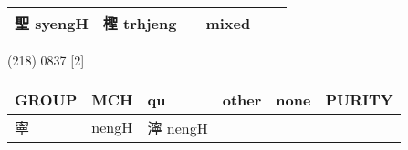 \documentclass[14pt,a4paper]{scrartcl}
\begin{document}
\begin{longtable}[c]{@{}llllll@{}}
\begin{minipage}[t]{0.14\columnwidth}
聖 syengH
\strut\end{minipage} &
\begin{minipage}[t]{0.14\columnwidth}\raggedright\strut
檉 trhjeng
\strut\end{minipage} &
\begin{minipage}[t]{0.14\columnwidth}\raggedright\strut
\strut\end{minipage} &
\begin{minipage}[t]{0.14\columnwidth}\raggedright\strut
mixed
\strut\end{minipage}\tabularnewline
\bottomrule
\end{longtable}

(218) 0837 {[}2{]}

\begin{longtable}[c]{@{}llllll@{}}
\toprule
\begin{minipage}[b]{0.14\columnwidth}\raggedright\strut
GROUP
\strut\end{minipage} &
\begin{minipage}[b]{0.14\columnwidth}\raggedright\strut
MCH
\strut\end{minipage} &
\begin{minipage}[b]{0.14\columnwidth}\raggedright\strut
qu
\strut\end{minipage} &
\begin{minipage}[b]{0.14\columnwidth}\raggedright\strut
other
\strut\end{minipage} &
\begin{minipage}[b]{0.14\columnwidth}\raggedright\strut
none
\strut\end{minipage} &
\begin{minipage}[b]{0.14\columnwidth}\raggedright\strut
PURITY
\strut\end{minipage}\tabularnewline
\midrule
\endhead
\begin{minipage}[t]{0.14\columnwidth}\raggedright\strut
寧
\strut\end{minipage} &
\begin{minipage}[t]{0.14\columnwidth}\raggedright\strut
nengH
\strut\end{minipage} &
\begin{minipage}[t]{0.14\columnwidth}\raggedright\strut
濘 nengH
\strut\end{minipage} &
\begin{minipage}[t]{0.14\columnwidth}\raggedright\strut
\strut\end{minipage} &
\begin{minipage}[t]{0.14\columnwidth}\raggedright\strut
\strut\end{minipage} &

\end{longtable}
\end{document}

